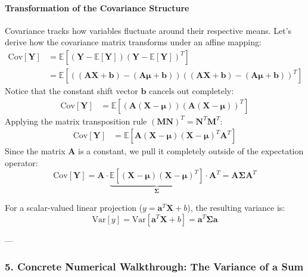 \documentclass{article}
\begin{document}
\paragraph{Transformation of the Covariance Structure}
Covariance tracks how variables fluctuate around their respective means. Let's derive how the covariance matrix transforms under an affine mapping:
\begin{align*}
\text{Cov}[\mathbf{Y}] &= \mathbb{E}\left[ (\mathbf{Y} - \mathbb{E}[\mathbf{Y}])(\mathbf{Y} - \mathbb{E}[\mathbf{Y}])^T \right] \\
&= \mathbb{E}\left[ ((\mathbf{A}\mathbf{X} + \mathbf{b}) - (\mathbf{A}\boldsymbol{\mu} + \mathbf{b}))((\mathbf{A}\mathbf{X} + \mathbf{b}) - (\mathbf{A}\boldsymbol{\mu} + \mathbf{b}))^T \right]
\end{align*}
Notice that the constant shift vector $\mathbf{b}$ cancels out completely:
\begin{align*}
\text{Cov}[\mathbf{Y}] &= \mathbb{E}\left[ (\mathbf{A}(\mathbf{X} - \boldsymbol{\mu}))(\mathbf{A}(\mathbf{X} - \boldsymbol{\mu}))^T \right]
\end{align*}
Applying the matrix transposition rule $(\mathbf{M}\mathbf{N})^T = \mathbf{N}^T\mathbf{M}^T$:
\begin{align*}
\text{Cov}[\mathbf{Y}] &= \mathbb{E}\left[ \mathbf{A}(\mathbf{X} - \boldsymbol{\mu})(\mathbf{X} - \boldsymbol{\mu})^T\mathbf{A}^T \right]
\end{align*}
Since the matrix $\mathbf{A}$ is a constant, we pull it completely outside of the expectation operator:
\begin{equation}
\text{Cov}[\mathbf{Y}] = \mathbf{A} \cdot \underbrace{\mathbb{E}\left[(\mathbf{X} - \boldsymbol{\mu})(\mathbf{X} - \boldsymbol{\mu})^T\right]}_{\boldsymbol{\Sigma}} \cdot \mathbf{A}^T = \mathbf{A}\boldsymbol{\Sigma}\mathbf{A}^T \tag{224}
\end{equation}

For a scalar-valued linear projection ($y = \mathbf{a}^T\mathbf{X} + b$), the resulting variance is:
\begin{equation}
\text{Var}[y] = \text{Var}[\mathbf{a}^T\mathbf{X} + b] = \mathbf{a}^T\boldsymbol{\Sigma}\mathbf{a} \tag{225}
\end{equation}

---

\subsubsection*{5. Concrete Numerical Walkthrough: The Variance of a Sum}
\end{document}
